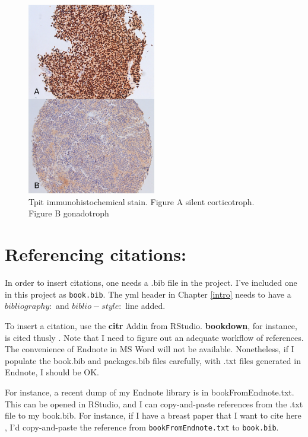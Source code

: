 \documentclass[]{book}
\begin{document}
\begin{figure}
\hypertarget{id}{%
\centering
\includegraphics[width=0.5\textwidth,height=0.5\textheight]{_bookdown_files/pathologyImages/TpitIHC.jpg}
\caption{Tpit immunohistochemical stain. Figure A silent corticotroph. Figure B gonadotroph}\label{id}
}
\end{figure}

\hypertarget{referencing-citations}{%
\section{Referencing citations:}\label{referencing-citations}}

In order to insert citations, one needs a .bib file in the project. I've included one in this project as \texttt{book.bib}. The yml header in Chapter \ref{intro} needs to have a \(bibliography:\) and \(biblio-style:\) line added.

To insert a citation, use the \textbf{citr} Addin from RStudio. \textbf{bookdown}, for instance, is cited thusly \citep{R-bookdown}. Note that I need to figure out an adequate workflow of references. The convenience of Endnote in MS Word will not be available. Nonetheless, if I populate the book.bib and packages.bib files carefully, with .txt files generated in Endnote, I should be OK.

For instance, a recent dump of my Endnote library is in bookFromEndnote.txt. This can be opened in RStudio, and I can copy-and-paste references from the .txt file to my book.bib. For instance, if I have a breast paper that I want to cite here \citep{RN2750}, I'd copy-and-paste the reference from \texttt{bookFromEndnote.txt} to \texttt{book.bib}.
\end{document}

